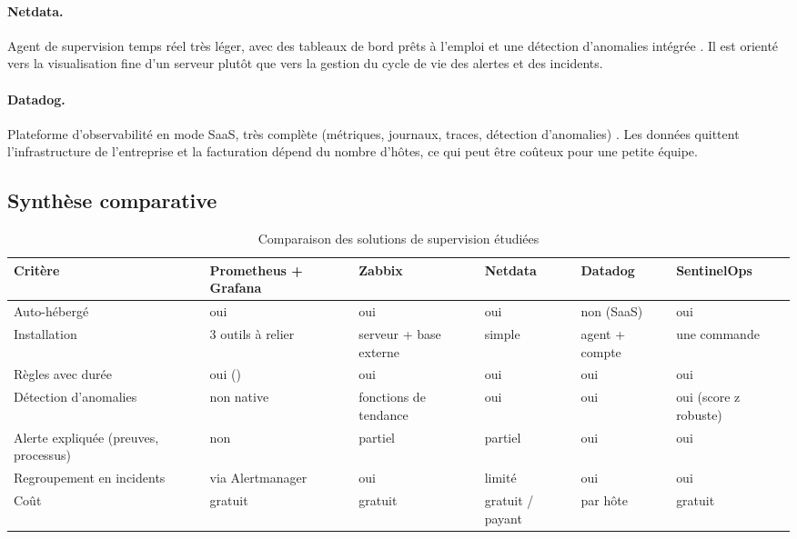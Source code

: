 \paragraph{Netdata.}
Agent de supervision temps réel très léger, avec des tableaux de bord prêts à l'emploi et une
détection d'anomalies intégrée \cite{netdata}. Il est orienté vers la visualisation fine d'un
serveur plutôt que vers la gestion du cycle de vie des alertes et des incidents.

\paragraph{Datadog.}
Plateforme d'observabilité en mode SaaS, très complète (métriques, journaux, traces,
détection d'anomalies) \cite{datadog}. Les données quittent l'infrastructure de l'entreprise
et la facturation dépend du nombre d'hôtes, ce qui peut être coûteux pour une petite équipe.

\subsection{Synthèse comparative}

\begin{table}[htbp]
\centering
\small
\begin{tabularx}{\linewidth}{L{3.3cm}YYYYY}
\toprule
\textbf{Critère} & \textbf{Prometheus + Grafana} & \textbf{Zabbix} & \textbf{Netdata} & \textbf{Datadog} & \textbf{SentinelOps} \\
\midrule
Auto-hébergé & oui & oui & oui & non (SaaS) & oui \\
Installation & 3 outils à relier & serveur + base externe & simple & agent + compte & une commande \\
Règles avec durée & oui () & oui & oui & oui & oui \\
Détection d'anomalies & non native & fonctions de tendance & oui & oui & oui (score z robuste) \\
Alerte expliquée (preuves, processus) & non & partiel & partiel & oui & oui \\
Regroupement en incidents & via Alertmanager & oui & limité & oui & oui \\
Coût & gratuit & gratuit & gratuit / payant & par hôte & gratuit \\
\bottomrule
\end{tabularx}
\caption{Comparaison des solutions de supervision étudiées}
\label{tab:comparatif}
\end{table}

